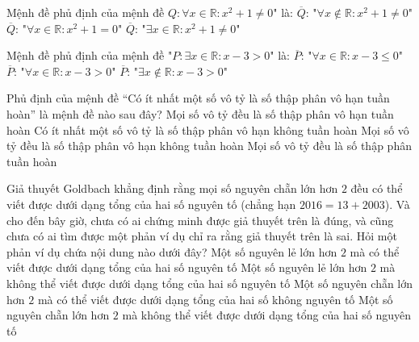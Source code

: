 \begin{ex}%
	Mệnh đề phủ định của  mệnh đề $Q: \forall x\in\mathbb{R}: x^2+1\neq 0$" là:
		{$\overline{Q}$: "$\forall  x\notin\mathbb{R}: x^2+1\neq 0$"}
		 {$\overline{Q}$: "$\forall x\in\mathbb{R}: x^2+1=0$"}
		{$\overline{Q}$: "$\exists x\in\mathbb{R}: x^2+1\neq 0$"} 
\end{ex}

\begin{ex}%
	 Mệnh đề phủ định của mệnh đề "$P: \exists x\in\mathbb{R}: x-3>0$" là:
		{\True $\overline{P}$: "$\forall x\in\mathbb{R}: x-3\leq 0$"} 
		 {$\overline{P}$: "$\forall x\in\mathbb{R}: x-3>0$"}
		{$\overline{P}$: "$\exists x\notin\mathbb{R}:  x-3>0$"}
\end{ex}

\begin{ex}%
	Phủ định của mệnh đề ``Có ít nhất một số vô tỷ là số thập phân vô hạn tuần hoàn'' là mệnh đề  nào sau đây?
	\choice 
		{Mọi số vô tỷ đều là số thập  phân vô hạn tuần hoàn}
		{Có ít nhất một số vô tỷ là số thập phân vô hạn không  tuần hoàn}
		{\True Mọi số vô tỷ đều là số thập phân vô hạn không tuần hoàn} 
		{Mọi số vô tỷ  đều là số thập phân tuần hoàn}
\end{ex}

\begin{ex}%
	Giả thuyết Goldbach khẳng định rằng mọi số nguyên chẵn lớn hơn $2$ đều có thể viết được dưới dạng tổng của hai số nguyên tố (chẳng hạn $2016=13+2003$). Và cho đến bây giờ, chưa có ai chứng minh được giả thuyết trên là  đúng, và cũng chưa có ai tìm được một phản ví dụ chỉ ra rằng giả thuyết trên là sai. Hỏi một phản ví dụ chứa nội dung nào dưới đây?
	\choice 
		{Một số nguyên lẻ lớn hơn $2$ mà có thể viết được  dưới dạng tổng của hai số nguyên tố}
		{Một số nguyên lẻ lớn hơn $2$  mà không thể viết được dưới dạng tổng của hai số nguyên tố}
		{Một số nguyên chẵn lớn hơn $2$ mà có thể viết được dưới dạng tổng của hai  số không nguyên tố}
		{\True  Một số nguyên chẵn lớn hơn $2$ mà không thể viết được dưới dạng tổng của hai số nguyên tố}
\end{ex}

